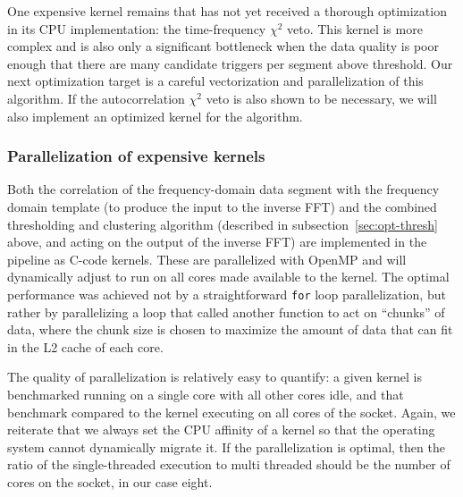 One expensive kernel remains that has not yet received a thorough optimization
in its CPU implementation: the time-frequency $\chi^2$ veto.  This kernel is more complex and
is also only a significant bottleneck when the data quality is poor enough that
there are many candidate triggers per segment above threshold. %
Our next
optimization target is a careful vectorization and parallelization of this
algorithm. %
If the
autocorrelation $\chi^2$ veto is also
shown to be necessary, we
will also implement an optimized kernel for the algorithm. 

\vspace*{-10pt}
\subsubsection{Parallelization of expensive kernels}
\vspace*{-05pt}
\label{sec:parall-expens-kern}

Both the correlation of the frequency-domain data segment with the frequency
domain template (to produce the input to the inverse FFT) and the combined
thresholding and clustering algorithm (described in
subsection~\ref{sec:opt-thresh} above, and acting on the output of the inverse
FFT) are implemented in the pipeline as C-code kernels.  These are parallelized
with OpenMP and will dynamically adjust to run on all cores made available to
the kernel. The optimal performance was achieved not by a straightforward
\texttt{for} loop parallelization, but rather by parallelizing a loop that
called another function to act on ``chunks'' of data, where the chunk size is
chosen to maximize the amount of data that can fit in the L2 cache of each
core.

The quality of parallelization is relatively easy to quantify: a given kernel is
benchmarked running on a single core with all other cores idle, and that
benchmark compared to the kernel executing on all cores of the socket. Again, we
reiterate that we always set the CPU affinity of a kernel so that the operating
system cannot dynamically migrate it. If the parallelization is optimal, then
the ratio of the single-threaded execution to multi threaded should be the number
of cores on the socket, in our case eight.

